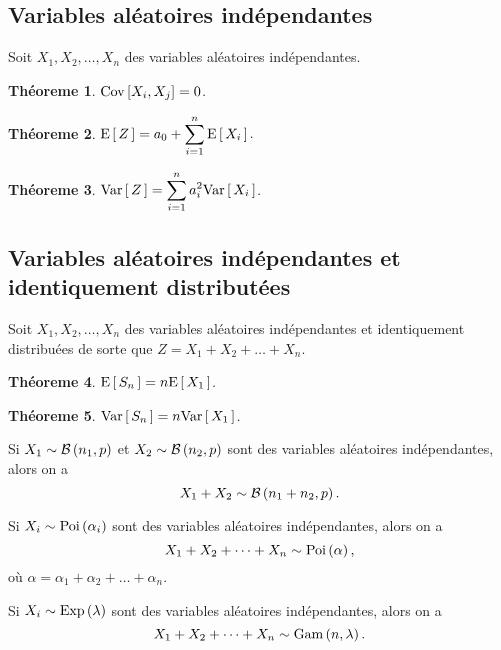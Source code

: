\documentclass[11pt]{article}
\newcommand\Bin[2]{%
	\ensuremath{%
		\mathcal{B}\left(#1,#2\right)%
	}%
}%
\newcommand\Poi[1]{%
	\ensuremath{%
		\mathrm{Poi}\left(#1\right)%
	}%
}%
\newcommand\Exp[1]{%
	\ensuremath{%
		\mathrm{Exp}\left(#1\right)%
	}%
}%
\newcommand\Gam[2]{%
	\ensuremath{%
		\mathrm{Gam}\left(#1,#2\right)%
	}%
}%
\newcommand\Esp[1]{%
	\ensuremath{%
		\mathrm{E}\left[\,#1\,\right]%
	}%
}%
\newcommand\Var[1]{%
	\ensuremath{%
		\mathrm{Var}\left[\,#1\,\right]%
	}%
}%
\newcommand\Cov[2]{%
	\ensuremath{%
		\mathrm{Cov}\left[#1,#2\right]%
	}%
}%
\newtheorem{theoreme}{Théoreme}[section]
\begin{document}
\subsection{Variables aléatoires indépendantes}
Soit $X_1,X_2,\dots,X_n$ des variables aléatoires indépendantes.

\begin{theoreme}
	$\Cov{X_i}{X_j}=0$.
\end{theoreme}

\begin{theoreme}
	$\Esp{Z}=a_0+\displaystyle\sum_{i=1}^n\Esp{X_i}$.
\end{theoreme}

\begin{theoreme}
	$\Var{Z}=\displaystyle\sum_{i=1}^na_i^2\Var{X_i}$.
\end{theoreme}

\subsection{Variables aléatoires indépendantes et identiquement distributées}
Soit $X_1,X_2,\dots,X_n$ des variables aléatoires indépendantes et
identiquement distribuées de sorte que $Z=X_1+X_2+\dots+X_n$.

\begin{theoreme}
	$\Esp{S_n}=n\Esp{X_1}$.
\end{theoreme}

\begin{theoreme}
	$\Var{S_n}=n\Var{X_1}$.
\end{theoreme}

\begin{exemple}
	Si $X_1\sim\Bin{n_1}{p}$ et $X_2\sim\Bin{n_2}{p}$ sont des variables
	aléatoires indépendantes, alors on a
	\begin{equation*}
		X_1+X_2\sim\Bin{n_1+n_2}{p}.
	\end{equation*}
\end{exemple}

\begin{exemple}
	Si $X_i\sim\Poi{\alpha_i}$ sont des variables aléatoires indépendantes,
	alors on a
	\begin{equation*}
		X_1+X_2+\dots+X_n\sim\Poi{\alpha},
	\end{equation*}
	où $\alpha=\alpha_1+\alpha_2+\dots+\alpha_n$.
\end{exemple}

\begin{exemple}
	Si $X_i\sim\Exp{\lambda}$ sont des variables aléatoires indépendantes,
	alors on a
	\begin{equation*}
		X_1+X_2+\dots+X_n\sim\Gam{n}{\lambda}.
	\end{equation*}
\end{exemple}
\end{document}
